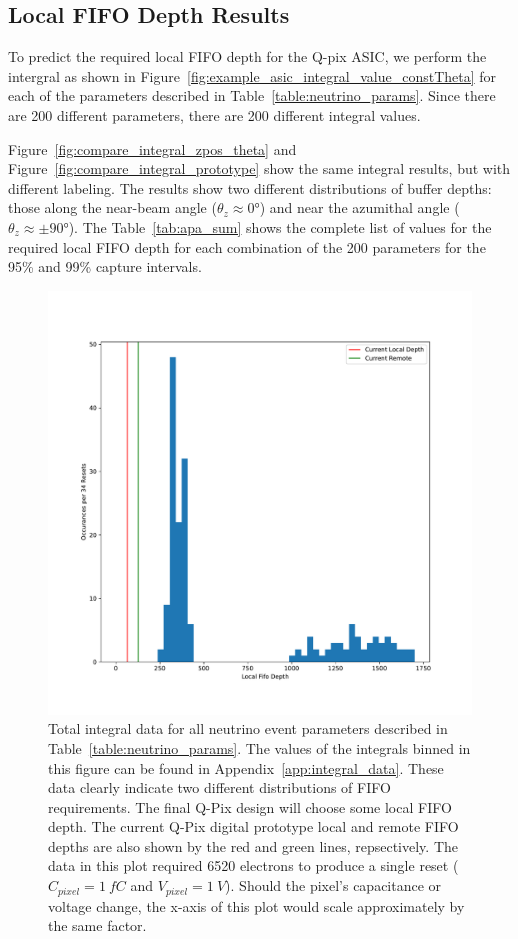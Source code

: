 \subsection{Local FIFO Depth Results}

To predict the required local FIFO depth for the Q-pix ASIC, we perform the intergral as shown in Figure~\ref{fig:example_asic_integral_value_constTheta} for each of the parameters described in Table~\ref{table:neutrino_params}. 
Since there are 200 different parameters, there are 200 different integral values.

Figure~\ref{fig:compare_integral_zpos_theta} and Figure~\ref{fig:compare_integral_prototype} show the same integral results, but with different labeling.
The results show two different distributions of buffer depths: those along the near-beam angle ($\theta_{z} \approx 0$\unit{\degree}) and near the azumithal angle ($\theta_{z} \approx \pm 90$\unit{\degree}). 
The Table~\ref{tab:apa_sum} shows the complete list of values for the required local FIFO depth for each combination of the 200 parameters for the 95\% and 99\% capture intervals.

\begin{figure}[]
\centering
\includegraphics[width=\textwidth]{images/df_nolabel_line.pdf}
\caption{Total integral data for all neutrino event parameters described in Table~\ref{table:neutrino_params}.
The values of the integrals binned in this figure can be found in Appendix~\ref{app:integral_data}.
These data clearly indicate two different distributions of FIFO requirements.
The final Q-Pix design will choose some local FIFO depth.
The current Q-Pix digital prototype local and remote FIFO depths are also shown by the red and green lines, repsectively.
The data in this plot required 6520 electrons to produce a single reset ($C_{pixel} = 1~\unit{fC}$ and $V_{pixel} = 1~\unit{V}$).
Should the pixel's capacitance or voltage change, the x-axis of this plot would scale approximately by the same factor.
}
\end{figure}~\label{fig:compare_integral_prototype}

